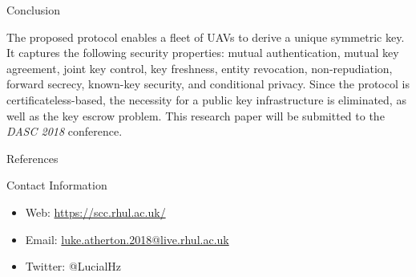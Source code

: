 \documentclass[final]{beamer}
\newlength{\onecolwid}
\begin{document}
\begin{frame}[t]
\begin{columns}[t]
\begin{column}{\onecolwid}
\vspace*{1cm}
\begin{block}{Conclusion}

The proposed protocol enables a fleet of UAVs to derive a unique symmetric key. It captures the following security properties: mutual authentication, mutual key agreement, joint key control, key freshness, entity revocation, non-repudiation, forward secrecy, known-key security, and conditional privacy. Since the protocol is certificateless-based, the necessity for a public key infrastructure is eliminated, as well as the key escrow problem. This research paper will be submitted to the {\em DASC 2018} conference.

\end{block}

\vspace*{1cm}
\begin{block}{References}

\nocite{*} %
\small{
}

\end{block}



\begin{alertblock}{Contact Information}

\begin{itemize}
\item Web: \href{https://scc.rhul.ac.uk/}{https://scc.rhul.ac.uk/}
\item Email: \href{luke.atherton.2018@live.rhul.ac.uk}{luke.atherton.2018@live.rhul.ac.uk}
\item Twitter: @LucialHz
\end{itemize}

\end{alertblock}


\end{column} %

\end{columns} %

\end{frame} %
\end{document}
